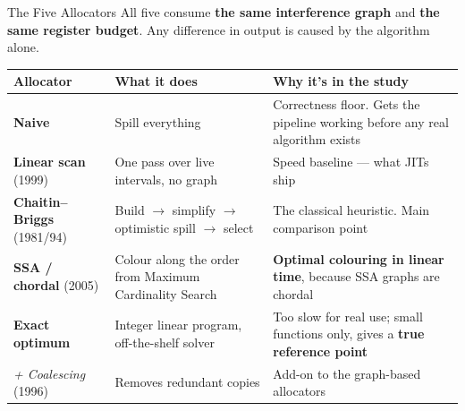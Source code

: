 \documentclass[aspectratio=169,11pt]{beamer}
\begin{document}
\begin{frame}{The Five Allocators}
{\scriptsize All five consume \textbf{the same interference graph} and
\textbf{the same register budget}. Any difference in output is caused by the
algorithm alone.}\par\vspace{2mm}
{\scriptsize
\begin{tabular}{@{}p{2.5cm}p{4.6cm}p{5.7cm}@{}}
\toprule
Allocator & What it does & Why it's in the study \\
\midrule
\textbf{Naive}            & Spill everything & Correctness floor. Gets the pipeline working before any real algorithm exists \\
\textbf{Linear scan} (1999)& One pass over live intervals, no graph & Speed baseline --- what JITs ship \\
\textbf{Chaitin--Briggs} (1981/94) & Build $\rightarrow$ simplify $\rightarrow$ optimistic spill $\rightarrow$ select & The classical heuristic. Main comparison point \\
\textbf{SSA / chordal} (2005) & Colour along the order from Maximum Cardinality Search & \textbf{Optimal colouring in linear time}, because SSA graphs are chordal \\
\textbf{Exact optimum}    & Integer linear program, off-the-shelf solver & Too slow for real use; small functions only, gives a \textbf{true reference point} \\
\emph{+ Coalescing} (1996)& Removes redundant copies & Add-on to the graph-based allocators \\
\bottomrule
\end{tabular}}\end{frame}
\end{document}

